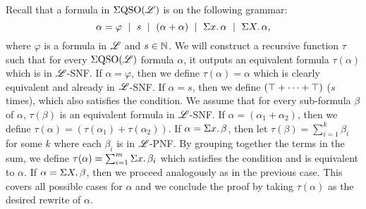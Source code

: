 Recall that a formula in $\Sigma{\rm QSO}(\mathscr{L})$ is on the following grammar:
$$
\alpha = \varphi \ \mid \ s \ \mid \ (\alpha + \alpha) \ \mid \ \sa{x} \alpha \ \mid \ \sa{X} \alpha,
$$
where $\varphi$ is a formula in $\mathscr{L}$ and $s\in\mathbb{N}$. We will construct a recursive function $\tau$ such that for every $\Sigma{\rm QSO}(\mathscr{L})$ formula $\alpha$, it outputs an equivalent formula $\tau(\alpha)$ which is in $\mathscr{L}$-SNF. If $\alpha = \varphi$, then we define $\tau(\alpha) = \alpha$ which is clearly equivalent and already in $\mathscr{L}$-SNF. If $\alpha = s$, then we define $(\top + \cdots + \top)$ ($s$ times), which also satisfies the condition. We assume that for every sub-formula $\beta$ of $\alpha$, $\tau(\beta)$ is an equivalent formula in $\mathscr{L}$-SNF. If $\alpha = (\alpha_1 + \alpha_2)$, then we define $\tau(\alpha) = (\tau(\alpha_1) + \tau(\alpha_2))$. If $\alpha = \Sigma{x}.\,\beta$, then let $\tau(\beta) = \sum_{i = 1}^{k}\beta_i$ for some $k$ where each $\beta_i$ is in $\mathscr{L}$-PNF. By grouping together the terms in the sum, we define $\tau(\alpha) = \sum_{i = 1}^{m}\Sigma{x}.\,\beta_i$ which satisfies the condition and is equivalent to $\alpha$. If $\alpha = \Sigma{X}.\,\beta$, then we proceed analogously as in the previous case. This covers all possible cases for $\alpha$ and we conclude the proof by taking $\tau(\alpha)$ as the desired rewrite of $\alpha$.